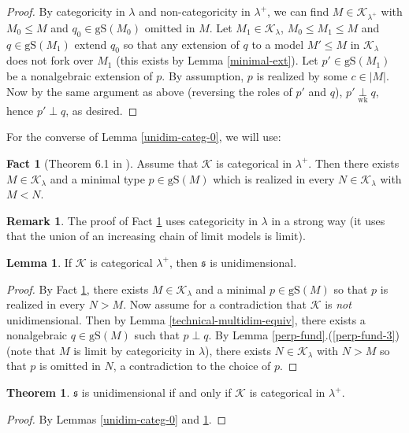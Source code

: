 \documentclass[12pt]{amsart}
\theoremstyle{definition}
\newtheorem{lem}[mydef]{Lemma}
\newtheorem{thm}[mydef]{Theorem}
\newtheorem{remark}[mydef]{Remark}
\newtheorem{fact}[mydef]{Fact}
\begin{document}
\begin{proof}
  By categoricity in $\lambda$ and non-categoricity in $\lambda^+$, we can find $M \in {\mathcal{K}}_{\lambda^+}$ with $M_0 {\le} M$ and $q_0 \in {\text{gS}} (M_0)$ omitted in $M$. Let $M_1 \in {\mathcal{K}}_\lambda$, $M_0 {\le} M_1 {\le} M$ and $q \in {\text{gS}} (M_1)$ extend $q_0$ so that any extension of $q$ to a model $M' {\le} M$ in ${\mathcal{K}}_\lambda$ does not fork over $M_1$ (this exists by Lemma \ref{minimal-ext}). Let $p' \in {\text{gS}} (M_1)$ be a nonalgebraic extension of $p$. By assumption, $p$ is realized by some $c \in |M|$. Now by the same argument as above (reversing the roles of $p'$ and $q$), $p' {{{{\underset{{{\text{wk}}}}{\overset{{{{}}}}{{\perp}}}}}}} q$, hence $p' \perp q$, as desired.
\end{proof}

For the converse of Lemma \ref{unidim-categ-0}, we will use:

\begin{fact}[Theorem 6.1 in \cite{tamenessthree}]\label{no-vp-fact}
  Assume that ${\mathcal{K}}$ is categorical in $\lambda^+$. Then there exists $M \in {\mathcal{K}}_\lambda$ and a minimal type $p \in {\text{gS}} (M)$ which is realized in every $N \in {\mathcal{K}}_\lambda$ with $M {<} N$.
\end{fact}
\begin{remark}
  The proof of Fact \ref{no-vp-fact} uses categoricity in $\lambda$ in a strong way (it uses that the union of an increasing chain of limit models is limit).
\end{remark}

\begin{lem}\label{unidim-categ-1}
  If ${\mathcal{K}}$ is categorical $\lambda^+$, then ${\mathfrak{s}}$ is unidimensional.
\end{lem}
\begin{proof}
  By Fact \ref{no-vp-fact}, there exists $M \in {\mathcal{K}}_{\lambda}$ and a minimal $p \in {\text{gS}} (M)$ so that $p$ is realized in every $N {>} M$. Now assume for a contradiction that ${\mathcal{K}}$ is \emph{not} unidimensional. Then by Lemma \ref{technical-multidim-equiv}, there exists a nonalgebraic $q \in {\text{gS}} (M)$ such that $p \perp q$. By Lemma \ref{perp-fund}.(\ref{perp-fund-3}) (note that $M$ is limit by categoricity in $\lambda$), there exists $N \in {\mathcal{K}}_\lambda$ with $N {>} M$ so that $p$ is omitted in $N$, a contradiction to the choice of $p$.
\end{proof}

\begin{thm}\label{unidim-categ}
  ${\mathfrak{s}}$ is unidimensional if and only if ${\mathcal{K}}$ is categorical in $\lambda^+$.
\end{thm}
\begin{proof}
  By Lemmas \ref{unidim-categ-0} and \ref{unidim-categ-1}.
\end{proof}
\end{document}
